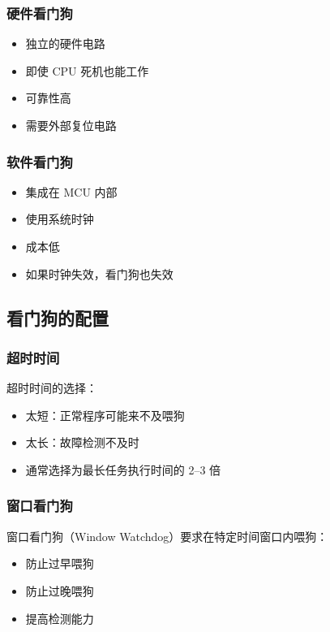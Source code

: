 \subsubsection{硬件看门狗}

\begin{itemize}
  \item 独立的硬件电路
  \item 即使 CPU 死机也能工作
  \item 可靠性高
  \item 需要外部复位电路
\end{itemize}

\subsubsection{软件看门狗}

\begin{itemize}
  \item 集成在 MCU 内部
  \item 使用系统时钟
  \item 成本低
  \item 如果时钟失效，看门狗也失效
\end{itemize}

\subsection{看门狗的配置}

\subsubsection{超时时间}

超时时间的选择：
\begin{itemize}
  \item 太短：正常程序可能来不及喂狗
  \item 太长：故障检测不及时
  \item 通常选择为最长任务执行时间的 2--3 倍
\end{itemize}

\subsubsection{窗口看门狗}

窗口看门狗（Window Watchdog）要求在特定时间窗口内喂狗：
\begin{itemize}
  \item 防止过早喂狗
  \item 防止过晚喂狗
  \item 提高检测能力
\end{itemize}

